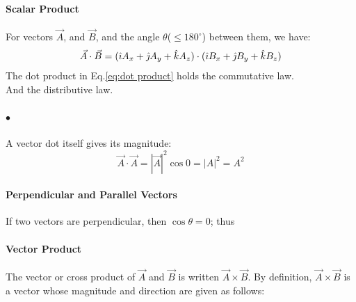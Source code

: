             \paragraph{Scalar Product} For vectors $\vec{A}$, and $\vec{B}$, and the angle $\theta$($\le 180^\circ$) between them,
            we have:
            $$ \vec{A} \cdot \vec{B} = (\hat{\imath} A_x +\hat{\jmath} A_y +\hat{k} A_z) \cdot (\hat{\imath} B_x +\hat{\jmath} B_y +\hat{k} B_z) $$
            The dot product in Eq.\eqref{eq:dot product} holds the commutative law.\\
            And the distributive law.

            \paragraph{$\bullet$} A vector dot itself gives its magnitude:
            $$ \vec{A} \cdot \vec{A} = |\vec{A}|^2\cos{0} = |A|^2 = A^2 $$

            \paragraph{Perpendicular and Parallel Vectors}  %
            \label{par:Perpendicular and Parallel Vectors}
            If two vectors are perpendicular, then $\cos{\theta} = 0$; thus
            \paragraph{Vector Product} %
            \label{par:Vector Product}
            The vector or cross product of $\vec{A}$ and $\vec{B}$ is written $\vec{A} \times \vec{B}$. By
            definition, $\vec{A} \times \vec{B}$ is a vector whose magnitude and direction are given as follows:
            
